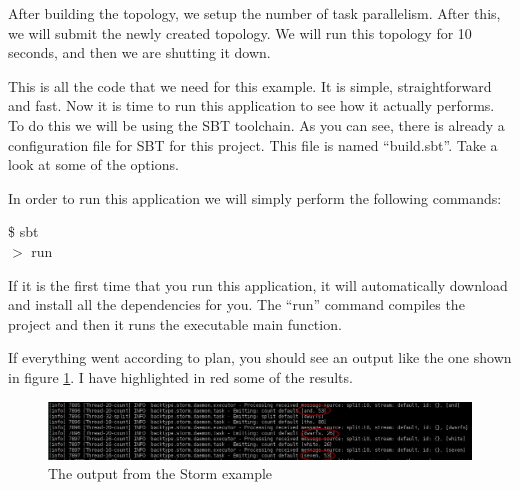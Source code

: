 After building the topology, we setup the number of task parallelism. After
this, we will submit the newly created topology. We will run this topology for
10 seconds, and then we are shutting it down.

This is all the code that we need for this example. It is simple,
straightforward and fast. Now it is time to run this application to see how it
actually performs. To do this we will be using the SBT toolchain. As you can
see, there is already a configuration file for SBT for this project. This file
is named ``build.sbt''. Take a look at some of the options.

In order to run this application we will simply perform the following commands:

\begin{center}
  \$ sbt \\
  $>$ run
\end{center}

If it is the first time that you run this application, it will automatically
download and install all the dependencies for you. The ``run'' command compiles
the project and then it runs the executable main function.

If everything went according to plan, you should see an output like the one
shown in figure \ref{fig:example_output}. I have highlighted in red some of the
results.

\begin{figure}
  \centering
  \includegraphics[scale=0.6]{images/example_output.png}
  \caption{The output from the Storm example}\label{fig:example_output}
\end{figure}
